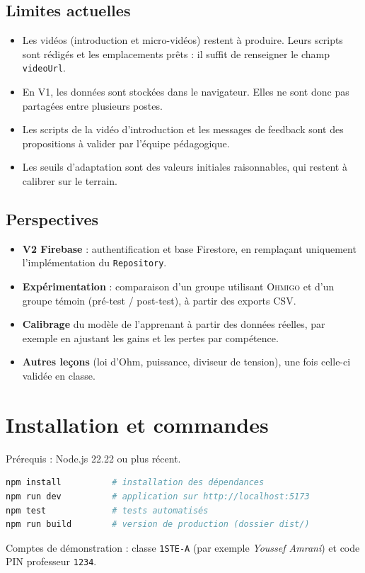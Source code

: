 \documentclass[11pt,a4paper]{report}
\newcommand{\code}[1]{\texttt{#1}}
\newcommand{\ohmigo}{\textsc{Ohmigo}}
\begin{document}
\section{Limites actuelles}
\begin{itemize}
  \item Les vidéos (introduction et micro-vidéos) restent à produire. Leurs scripts sont rédigés et les emplacements prêts : il suffit de renseigner le champ \code{videoUrl}.
  \item En V1, les données sont stockées dans le navigateur. Elles ne sont donc pas partagées entre plusieurs postes.
  \item Les scripts de la vidéo d'introduction et les messages de feedback sont des propositions à valider par l'équipe pédagogique.
  \item Les seuils d'adaptation sont des valeurs initiales raisonnables, qui restent à calibrer sur le terrain.
\end{itemize}

\section{Perspectives}
\begin{itemize}
  \item \textbf{V2 Firebase} : authentification et base Firestore, en remplaçant uniquement l'implémentation du \code{Repository}.
  \item \textbf{Expérimentation} : comparaison d'un groupe utilisant \ohmigo{} et d'un groupe témoin (pré-test / post-test), à partir des exports CSV.
  \item \textbf{Calibrage} du modèle de l'apprenant à partir des données réelles, par exemple en ajustant les gains et les pertes par compétence.
  \item \textbf{Autres leçons} (loi d'Ohm, puissance, diviseur de tension), une fois celle-ci validée en classe.
\end{itemize}

\appendix
\chapter{Installation et commandes}
Prérequis : Node.js 22.22 ou plus récent.
\begin{lstlisting}[language=bash]
npm install          # installation des dépendances
npm run dev          # application sur http://localhost:5173
npm test             # tests automatisés
npm run build        # version de production (dossier dist/)
\end{lstlisting}
Comptes de démonstration : classe \code{1STE-A} (par exemple \emph{Youssef Amrani}) et code PIN professeur \code{1234}.
\end{document}

